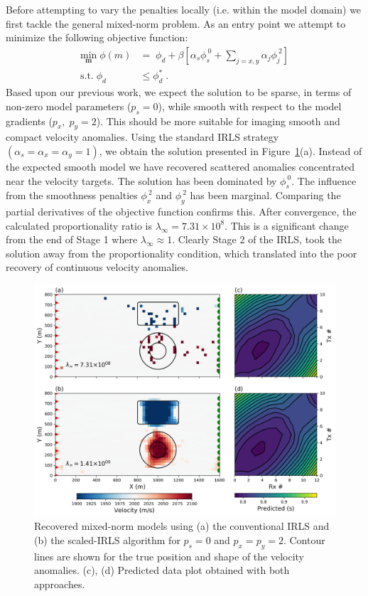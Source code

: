 \documentclass[extra,referee]{gji}
\begin{document}
Before attempting to vary the penalties locally (i.e. within the model domain) we first tackle the general mixed-norm problem.
As an entry point we attempt to minimize the following objective function:
\begin{equation}
\begin{split}\label{mixNorm}
\underset{\mathbf{m}}{\text{min}}\; \phi(m) & = \; \phi_d + \beta \left[ \alpha_s \phi_s^{\:0} + \sum_{j=x,y} \alpha_j \phi_j^{\:2} \right] \\
\text{s.t.} \; \phi_d & \leq \phi_d^* \; .
\end{split}
\end{equation}
Based upon our previous work, we expect the solution to be sparse, in terms of non-zero model parameters ($p_s = 0$), while smooth with respect to the model gradients ($p_x,\; p_y = 2$). This should be more suitable for  imaging smooth and compact velocity anomalies.
Using the standard IRLS strategy $(\alpha_s=\alpha_x=\alpha_y=1)$, we obtain the solution presented in Figure~\ref{Problem2D_lpnorm}(a). Instead of the expected smooth model we have recovered scattered anomalies concentrated near the velocity targets. The solution has been dominated by $\phi_s^{\:0}$. The influence from the smoothness penalties $\phi_x^{\:2}$ and $\phi_y^{\:2}$ has been marginal.
Comparing the partial derivatives of the objective function confirms this. After convergence, the calculated proportionality ratio is $\lambda_\infty = 7.31\times10^8$.
This is a significant change from the end of Stage 1 where $\lambda_\infty \approx 1$.
Clearly Stage 2 of the IRLS, took the solution away from the proportionality condition, which translated into the poor recovery of continuous velocity anomalies.

\begin{figure}
\includegraphics[width=\columnwidth]{Figures/Problem2D_MixedLpScale.png}
\caption{Recovered mixed-norm models using (a) the conventional IRLS and (b) the scaled-IRLS algorithm for $p_s=0$ and $p_x=p_y=2$. Contour lines are shown for the true position and shape of the velocity anomalies. (c), (d) Predicted data plot obtained with both approaches.
}
\label{Problem2D_lpnorm}
\end{figure}
\end{document}
